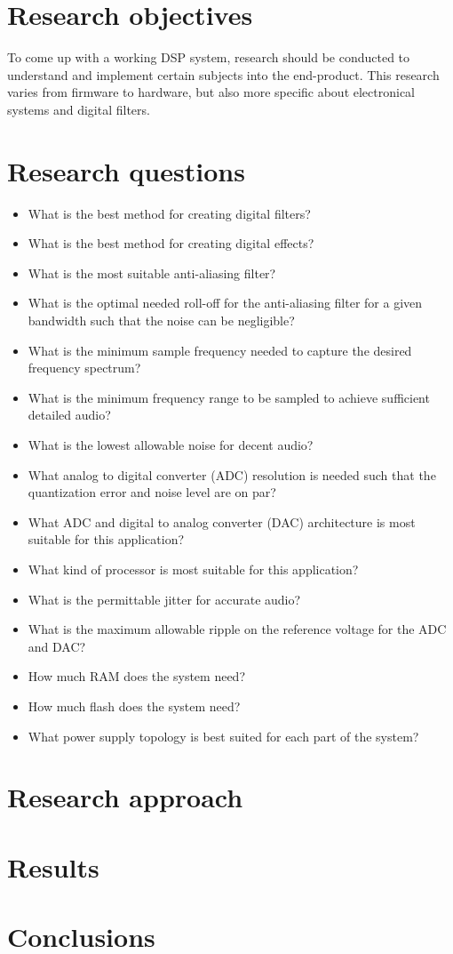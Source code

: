 \section{Research objectives}

To come up with a working DSP system, research should be conducted to understand and implement certain subjects into the end-product. This research varies from firmware to hardware, but also more specific about electronical systems and digital filters.

\section{Research questions}

\begin{itemize} %
	\setlength\itemsep{-0.3em} %
	\item What is the best method for creating digital filters?
	\item What is the best method for creating digital effects?
	\item What is the most suitable anti-aliasing filter?
	\item What is the optimal needed roll-off for the anti-aliasing filter for a given bandwidth such that the noise can be negligible?
	\item What is the minimum sample frequency needed to capture the desired frequency spectrum?
	\item What is the minimum frequency range to be sampled to achieve sufficient detailed audio?
	\item What is the lowest allowable noise for decent audio?
	\item What analog to digital converter (ADC) resolution is needed such that the quantization error and noise level are on par?
	\item What ADC and digital to analog converter (DAC) architecture is most suitable for this application?
	\item What kind of processor is most suitable for this application?
	\item What is the permittable jitter for accurate audio?
	\item What is the maximum allowable ripple on the reference voltage for the ADC and DAC?
	\item How much RAM does the system need?
	\item How much flash does the system need?
	\item What power supply topology is best suited for each part of the system? \\
\end{itemize}

\section{Research approach}



\section{Results}

\section{Conclusions}

